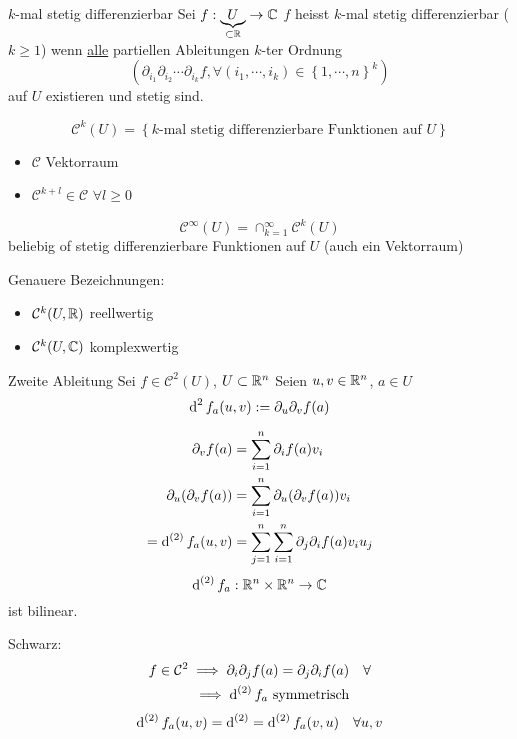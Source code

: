 \begin{Def}{$k$-mal stetig differenzierbar}
  Sei $f:\underbrace{U}_{\subset\mathbb{R}}\to \mathbb{C}$  $f$ heisst $k$-mal stetig differenzierbar ($k\geq 1$) wenn \underline{alle} partiellen Ableitungen $k$-ter Ordnung
  \[\left( \partial_{i_1}\partial_{i_2}\cdots\partial_{i_k}f,\forall \left( i_1,\cdots,i_k \right)\in\left\{ 1,\cdots,n \right\}^k \right)\]
  auf $U$ existieren und stetig sind.
\end{Def}
\begin{Def}
  \[\mathcal{C}^k(U)=\left\{ \text{$k$-mal stetig differenzierbare Funktionen auf $U$} \right\}\]
\end{Def}
\begin{Bem}
  \begin{itemize}
    \item $\mathcal{C}$ Vektorraum
    \item $\mathcal{C}^{k+l}\in\mathcal{C}$ $\forall l\geq 0$
  \end{itemize}
\end{Bem}
\begin{Def}
  \[\mathcal{C}^\infty(U)=\cap_{k=1}^\infty\mathcal{C}^k(U)\]
  beliebig of stetig differenzierbare Funktionen auf $U$ (auch ein Vektorraum)
\end{Def}
\begin{Not}
  Genauere Bezeichnungen:
  \begin{itemize}
    \item $\mathcal{C}^k(U,\mathbb{R})$ reellwertig
    \item $\mathcal{C}^k(U,\mathbb{C})$ komplexwertig
  \end{itemize}
\end{Not}
\begin{Def}{Zweite Ableitung}
  Sei $f\in\mathcal{C}^2(U)$, $U\subset\mathbb{R}^n$ Seien $u,v\in\mathbb{R}^n$, $a\in U$
  \[\operatorname{d}^2f_a(u,v):=\partial_u\partial_vf(a)\]
\end{Def}
\begin{Bem}
  \begin{align*}
    \partial_vf(a)&=\sum^n_{i=1}\partial_if(a)v_i\\
    \partial_u(\partial_vf(a))&=\sum^n_{i=1}\partial_u(\partial_vf(a))v_i\\
    =\operatorname{d}^{(2)}f_a(u,v)&=\sum_{j=1}^n\sum^n_{i=1}\partial_j\partial_if(a)v_iu_j
  \end{align*}
  \[\operatorname{d}^{(2)}f_a:\mathbb{R}^n\times\mathbb{R}^n\to\mathbb{C}\]
  ist bilinear.
\end{Bem}
\begin{Bem}
  Schwarz:
  \begin{align*}
    f\in\mathcal{C}^2\implies\partial_i\partial_jf(a)=\partial_j\partial_if(a)&& \forall\\
    \implies \operatorname{d}^{(2)}f_a\ \text{symmetrisch}
  \end{align*}
  \begin{align*}
    \operatorname{d}^{(2)}f_a(u,v)=\operatorname{d}^{(2)}=\operatorname{d}^{(2)}f_a(v,u)&&\forall u,v
  \end{align*}
\end{Bem}
